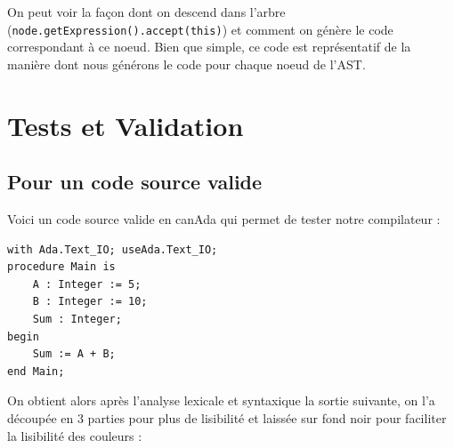 \documentclass[french,a4paper]{article}
\begin{document}
    On peut voir la façon dont on descend dans l'arbre (\texttt{node.getExpression().accept(this)}) et comment on génère le code correspondant à ce noeud. Bien que simple, ce code est représentatif de la manière dont nous générons le code pour chaque noeud de l'AST.

    \section{Tests et Validation}\label{sec:tests-et-validation}

    \subsection{Pour un code source valide}\label{subsec:pour-un-code-source-valide}

    Voici un code source valide en canAda qui permet de tester notre compilateur :

    \begin{lstlisting}[label={lst:lstlisting16}]
with Ada.Text_IO; useAda.Text_IO;
procedure Main is
    A : Integer := 5;
    B : Integer := 10;
    Sum : Integer;
begin
    Sum := A + B;
end Main;
    \end{lstlisting}

    On obtient alors après l'analyse lexicale et syntaxique la sortie suivante, on l'a découpée en 3 parties pour plus de lisibilité et laissée sur fond noir pour faciliter la lisibilité des couleurs :
\end{document}
